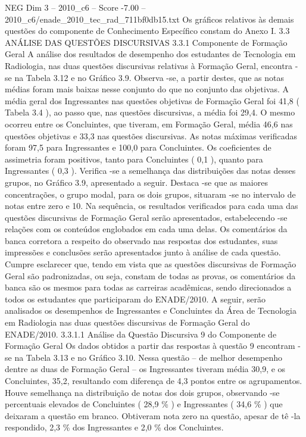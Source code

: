 \begin{textsample}{NEG Dim 3 – 2010\_c6 – Score -7.00 – 2010\_c6/enade\_2010\_tec\_rad\_711bf0db15.txt}
Os gráficos relativos às demais questões do componente de Conhecimento Específico constam do Anexo I. 3.3 ANÁLISE DAS QUESTÕES DISCURSIVAS 3.3.1 Componente de Formação Geral A análise dos resultados de desempenho dos estudantes de Tecnologia em Radiologia, nas duas questões discursivas relativas à Formação Geral, encontra -se na Tabela 3.12 e no Gráfico 3.9.
Observa -se, a partir destes, que as notas médias foram mais baixas nesse conjunto do que no conjunto das objetivas.
A média geral dos Ingressantes nas questões objetivas de Formação Geral foi 41,8 ( Tabela 3.4 ), ao passo que, nas questões discursivas, a média foi 29,4.
O mesmo ocorreu entre os Concluintes, que tiveram, em Formação Geral, média 46,6 nas questões objetivas e 33,3 nas questões discursivas.
As notas máximas verificadas foram 97,5 para Ingressantes e 100,0 para Concluintes.
Os coeficientes de assimetria foram positivos, tanto para Concluintes ( 0,1 ), quanto para Ingressantes ( 0,3 ).
Verifica -se a semelhança das distribuições das notas desses grupos, no Gráfico 3.9, apresentado a seguir.
Destaca -se que as maiores concentrações, o grupo modal, para os dois grupos, situaram -se no intervalo de notas entre zero e 10.
Na sequência, os resultados verificados para cada uma das questões discursivas de Formação Geral serão apresentados, estabelecendo -se relações com os conteúdos englobados em cada uma delas.
Os comentários da banca corretora a respeito do observado nas respostas dos estudantes, suas impressões e conclusões serão apresentados junto à análise de cada questão.
Cumpre esclarecer que, tendo em vista que as questões discursivas de Formação Geral são padronizadas, ou seja, constam de todas as provas, os comentários da banca são os mesmos para todas as carreiras acadêmicas, sendo direcionados a todos os estudantes que participaram do ENADE/2010.
A seguir, serão analisados os desempenhos de Ingressantes e Concluintes da Área de Tecnologia em Radiologia nas duas questões discursivas de Formação Geral do ENADE/2010. 3.3.1.1 Análise da Questão Discursiva 9 do Componente de Formação Geral Os dados obtidos a partir das respostas à questão 9 encontram -se na Tabela 3.13 e no Gráfico 3.10.
Nessa questão – de melhor desempenho dentre as duas de Formação Geral – os Ingressantes tiveram média 30,9, e os Concluintes, 35,2, resultando com diferença de 4,3 pontos entre os agrupamentos.
Houve semelhança na distribuição de notas dos dois grupos, observando -se percentuais elevados de Concluintes ( 28,9 \% ) e Ingressantes ( 34,6 \% ) que deixaram a questão em branco.
Obtiveram nota zero na questão, apesar de tê -la respondido, 2,3 \% dos Ingressantes e 2,0 \% dos Concluintes.

\end{textsample}
